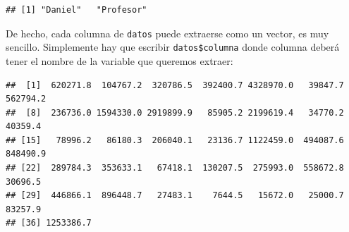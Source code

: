 \documentclass[
]{book}
\newenvironment{Shaded}{\begin{snugshade}}{\end{snugshade}}
\newcommand{\NormalTok}[1]{#1}
\newcommand{\OtherTok}[1]{\textcolor[rgb]{0.56,0.35,0.01}{#1}}
\newcommand{\SpecialCharTok}[1]{\textcolor[rgb]{0.81,0.36,0.00}{\textbf{#1}}}
\begin{document}
\begin{verbatim}
## [1] "Daniel"   "Profesor"
\end{verbatim}

De hecho, cada columna de \texttt{datos} puede extraerse como un vector, es muy sencillo. Simplemente hay que escribir \texttt{datos\$columna} donde columna deberá tener el nombre de la variable que queremos extraer:

\begin{Shaded}
\end{Shaded}

\begin{verbatim}
##  [1]  620271.8  104767.2  320786.5  392400.7 4328970.0   39847.7  562794.2
##  [8]  236736.0 1594330.0 2919899.9   85905.2 2199619.4   34770.2   40359.4
## [15]   78996.2   86180.3  206040.1   23136.7 1122459.0  494087.6  848490.9
## [22]  289784.3  353633.1   67418.1  130207.5  275993.0  558672.8   30696.5
## [29]  446866.1  896448.7   27483.1    7644.5   15672.0   25000.7   83257.9
## [36] 1253386.7
\end{verbatim}

\begin{Shaded}
\end{Shaded}
\end{document}

